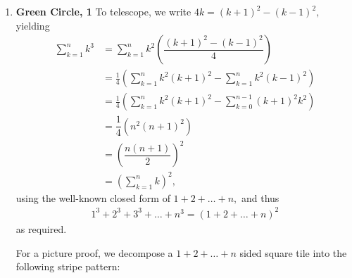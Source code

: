 \documentclass[12pt]{article}
\begin{document}
\begin{enumerate}
  \item \textbf{Green Circle, 1}
    To telescope, we write $4k = (k+1)^2 - (k -1)^2,$ yielding
    \begin{align*}
      \sum_{k = 1}^{n} k^3 &= \sum_{k = 1}^{n} k^2
      \left(\dfrac{(k+1)^2 - (k-1)^2}{4}\right) \\
      &= \frac{1}{4}\left(\sum_{k = 1}^{n} k^2(k+1)^2 - \sum_{k =
      1}^{n}k^2(k-1)^2\right) \\
      &= \frac{1}{4}\left(\sum_{k = 1}^{n} k^2(k+1)^2 - \sum_{k =
      0}^{n - 1}(k + 1)^2k^2\right) \\
      &= \dfrac{1}{4}\left(n^2(n+1)^2\right) \\
      &= \left (\dfrac{n(n+1)}{2} \right)^2 \\
      &= \left( \sum_{k = 1}^{n} k \right)^2,
    \end{align*}
    using the well-known closed form of $1 + 2 + \ldots + n,$ and thus
    \begin{align*}
      1^3 + 2^3 + 3^3 + \ldots  +n^3 = (1 + 2 + \ldots + n)^2
    \end{align*}
    as required.

    For a picture proof, we decompose a $1 + 2 + \ldots + n$ sided
    square tile into the following stripe pattern:

    \begin{center}
\end{center}
\end{enumerate}
\end{document}
